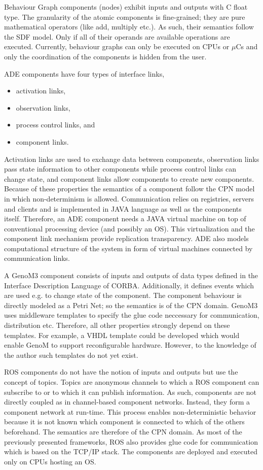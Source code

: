 \documentclass[a4paper,twocolumn]{esapub2005} %
\begin{document}
Behaviour Graph components (nodes) exhibit inputs and outputs with C float type.
The granularity of the atomic components is fine-grained; they are pure mathematical operators (like add, multiply etc.).
As such, their semantics follow the SDF model.
Only if all of their operands are available operations are executed.
Currently, behaviour graphs can only be executed on CPUs or $\mu$Cs and only the coordination of the components is hidden from the user.

ADE components have four types of interface links,
\begin{itemize}
    \item activation links,
    \item observation links,
    \item process control links, and
    \item component links.
\end{itemize}
Activation links are used to exchange data between components,
observation links pass state information to other components while process control links can change state,
and component links allow components to create new components.
Because of these properties the semantics of a component follow the CPN model in which non-determinism is allowed.
Communication relies on registries, servers and clients and is implemented in JAVA language as well as the components itself.
Therefore, an ADE component needs a JAVA virtual machine on top of conventional processing device (and possibly an OS).
This virtualization and the component link mechanism provide replication transparency.
ADE also models computational structure of the system in form of virtual machines connected by communication links.

A GenoM3 component consists of inputs and outputs of data types defined in the Interface Description Language of CORBA.
Additionally, it defines events which are used e.g. to change state of the component.
The component behaviour is directly modeled as a Petri Net; so the semantics is of the CPN domain.
GenoM3 uses middleware templates to specify the glue code neccessary for communication, distribution etc.
Therefore, all other properties strongly depend on these templates.
For example, a VHDL template could be developed which would enable GenoM to support reconfigurable hardware.
However, to the knowledge of the author such templates do not yet exist.

ROS components do not have the notion of inputs and outputs but use the concept of topics.
Topics are anonymous channels to which a ROS component can subscribe to or to which it can publish information.
As such, components are not directly coupled as in channel-based component networks.
Instead, they form a component network at run-time.
This process enables non-deterministic behavior because it is not known which component is connected to which of the others beforehand.
The semantics are therefore of the CPN domain.
As most of the previously presented frameworks, ROS also provides glue code for communication which is based on the TCP/IP stack.
The components are deployed and executed only on CPUs hosting an OS.
\end{document}

